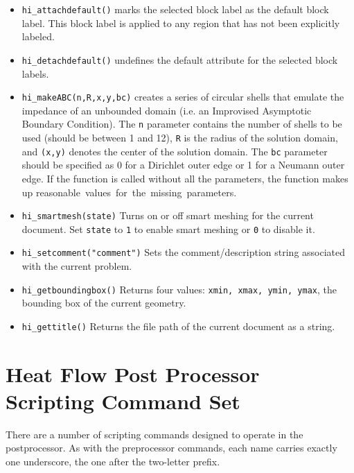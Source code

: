 \begin{itemize}
\item{\tt hi\_attachdefault()} marks the
selected block label as the default block label.  This block label
is applied to any region that has not been explicitly labeled.

\item{\tt hi\_detachdefault()} undefines the default
attribute for the selected block labels.

\item{\tt hi\_makeABC(n,R,x,y,bc)} creates a series of circular shells that emulate the
impedance of an unbounded domain (i.e. an Improvised Asymptotic Boundary
Condition).  The {\tt n} parameter contains the number of shells to be used
(should be between 1 and 12), {\tt R} is the radius of the solution domain, and
{\tt (x,y)} denotes the center of the solution domain.  The {\tt bc} parameter should
be specified as 0 for a Dirichlet outer edge or 1 for a Neumann outer edge.
If the function is called without all the parameters, the function makes up
reasonable values for the missing parameters. 

\item{\tt hi\_smartmesh(state)} Turns on or off smart meshing for the current document.  Set {\tt state} to {\tt 1} to enable smart meshing or {\tt 0} to disable it.

\item{\tt hi\_setcomment("comment")} Sets the comment/description string associated with the current problem.

\item{\tt hi\_getboundingbox()} Returns four values: {\tt xmin, xmax, ymin, ymax}, the bounding box of the current geometry.

\item{\tt hi\_gettitle()} Returns the file path of the current document as a string.

\end{itemize}

\section{Heat Flow Post Processor Scripting Command Set}

There are a number of scripting commands designed to operate in
the postprocessor. As with the preprocessor commands, each name
carries exactly one underscore, the one after the two-letter prefix.

